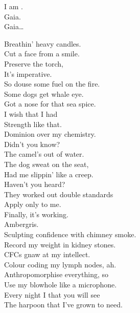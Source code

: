 I am . \\
Gaia. \\

Gaia… \\





Breathin' heavy candles. \\
Cut a face from a smile. \\
Preserve the torch, \\
It's imperative. \\
So douse some fuel on the fire. \\

Some dogs get whale eye. \\
Got a nose for that sea spice. \\
I wish that I had \\
Strength like that. \\
Dominion over my chemistry. \\

Didn't you know? \\
The camel's out of water. \\
The dog sweat on the seat, \\
Had me slippin' like a creep. \\

Haven't you heard? \\
They worked out double standards \\
Apply only to me. \\
Finally, it's working. \\
Ambergris. \\

Sculpting confidence with chimney smoke. \\
Record my weight in kidney stones. \\
CFCs gnaw at my intellect. \\
Colour coding my lymph nodes, ah. \\

Anthropomorphise everything, so \\
Use my blowhole like a microphone. \\
Every night I  that you will see \\
The harpoon that I've grown to need. \\

